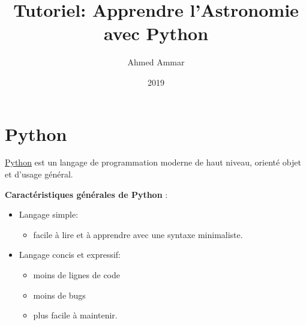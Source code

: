 \documentclass[%
oneside,                 %
final,                   %
10pt]{article}
\begin{document}

\newcommand{\exercisesection}[1]{\subsection*{#1}}






\title{Tutoriel: Apprendre l'Astronomie avec Python}


\author{Ahmed Ammar}

\date{2019
}

\section{Python}
\href{{http://www.python.org/}}{Python} est un langage de programmation moderne de haut niveau, orienté objet et d'usage général.

\textbf{Caractéristiques générales de Python} :

\begin{itemize}
\item Langage simple:
\begin{itemize}

  \item facile à lire et à apprendre avec une syntaxe minimaliste.

\end{itemize}

\noindent
\item Langage concis et expressif:
\begin{itemize}

  \item moins de lignes de code

  \item moins de bugs

  \item plus facile à maintenir.
\end{itemize}

\noindent
\end{itemize}
\end{document}
